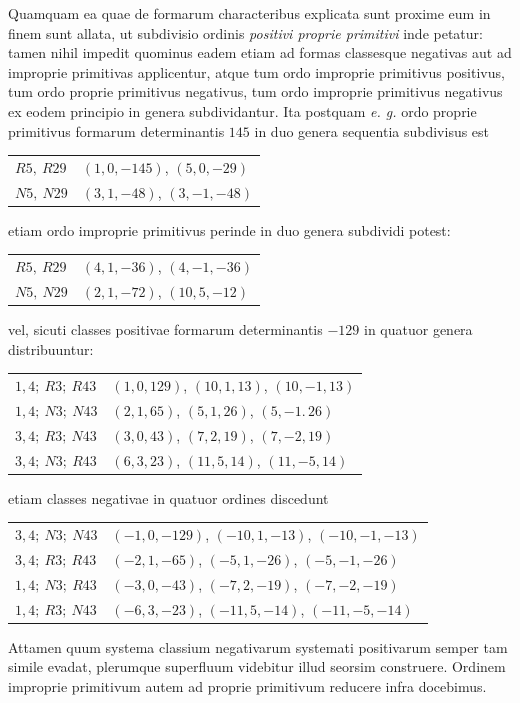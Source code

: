 Quamquam ea quae de formarum characteribus explicata sunt proxime eum in finem sunt allata, ut subdivisio ordinis \textit{positivi proprie primitivi} inde petatur: tamen nihil impedit quominus eadem etiam ad formas classesque negativas aut ad improprie primitivas applicentur, atque tum ordo improprie primitivus positivus, tum ordo proprie primitivus negativus, tum ordo improprie primitivus negativus ex eodem principio in genera subdividantur. Ita postquam \textit{e. g.} ordo proprie primitivus formarum determinantis $145$ in duo genera sequentia subdivisus est
\begin{center}
\begin{tabular}{l|l}
$R5,\ R29$ & $(1,0,-145)$, $(5,0,-29)$ \\
$N5,\ N29$ & $(3,1,-48)$, $(3,-1,-48)$
\end{tabular}
\end{center}
etiam ordo improprie primitivus perinde in duo genera subdividi potest:
\begin{center}
\begin{tabular}{l|l}
$R5,\ R29$ & $(4,1,-36)$, $(4,-1,-36)$ \\
$N5,\ N29$ & $(2,1,-72)$, $(10,5,-12)$
\end{tabular}
\end{center}
vel, sicuti classes positivae formarum determinantis $-129$ in quatuor genera distribuuntur:
\begin{center}
\begin{tabular}{l|l}
$1,4;\ R3;\ R43$ & $(1,0,129)$, $(10,1,13)$, $(10,-1,13)$ \\
$1,4;\ N3;\ N43$ & $(2,1,65)$, $(5,1,26)$, $(5,-1.\,26)$ \\
$3,4;\ R3;\ N43$ & $(3,0,43)$, $(7,2,19)$, $(7,-2,19)$ \\
$3,4;\ N3;\ R43$ & $(6,3,23)$, $(11,5,14)$, $(11,-5,14)$
\end{tabular}
\end{center}
etiam classes negativae in quatuor ordines discedunt
\begin{center}
\begin{tabular}{l|l}
$3,4;\ N3;\ N43$ & $(-1,0,-129)$, $(-10,1,-13)$, $(-10,-1,-13)$ \\
$3,4;\ R3;\ R43$ & $(-2,1,-65)$, $(-5,1,-26)$, $(-5,-1,-26)$ \\
$1,4;\ N3;\ R43$ & $(-3,0,-43)$, $(-7,2,-19)$, $(-7,-2,-19)$ \\
$1,4;\ R3;\ N43$ & $(-6,3,-23)$, $(-11,5,-14)$, $(-11,-5,-14)$
\end{tabular}
\end{center}
Attamen quum systema classium negativarum systemati positivarum semper tam simile evadat, plerumque superfluum videbitur illud seorsim construere. Ordinem improprie primitivum autem ad proprie primitivum reducere infra docebimus.


